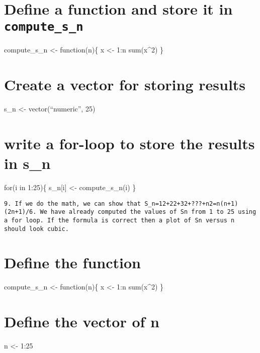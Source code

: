 \documentclass[
]{article}
\begin{document}
\hypertarget{define-a-function-and-store-it-in-compute_s_n}{%
\section{\texorpdfstring{Define a function and store it in
\texttt{compute\_s\_n}}{Define a function and store it in compute\_s\_n}}\label{define-a-function-and-store-it-in-compute_s_n}}

compute\_s\_n \textless- function(n)\{ x \textless- 1:n sum(x\^{}2) \}

\hypertarget{create-a-vector-for-storing-results}{%
\section{Create a vector for storing
results}\label{create-a-vector-for-storing-results}}

s\_n \textless- vector(``numeric'', 25)

\hypertarget{write-a-for-loop-to-store-the-results-in-s_n}{%
\section{write a for-loop to store the results in
s\_n}\label{write-a-for-loop-to-store-the-results-in-s_n}}

for(i in 1:25)\{ s\_n{[}i{]} \textless- compute\_s\_n(i) \}

\begin{verbatim}
9. If we do the math, we can show that S_n=12+22+32+???+n2=n(n+1)(2n+1)/6. We have already computed the values of Sn from 1 to 25 using a for loop. If the formula is correct then a plot of Sn versus n should look cubic.
\end{verbatim}

\hypertarget{define-the-function}{%
\section{Define the function}\label{define-the-function}}

compute\_s\_n \textless- function(n)\{ x \textless- 1:n sum(x\^{}2) \}

\hypertarget{define-the-vector-of-n}{%
\section{Define the vector of n}\label{define-the-vector-of-n}}

n \textless- 1:25
\end{document}
